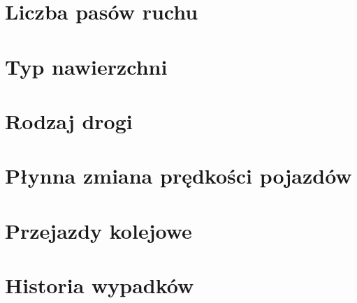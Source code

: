 \newpage
\section{Liczba pasów ruchu}
\label{sec:zakręty}

\newpage
\section{Typ nawierzchni}
\label{sec:zakręty}

\newpage
\section{Rodzaj drogi}
\label{sec:zakręty}

\newpage
\section{Płynna zmiana prędkości pojazdów}
\label{sec:zakręty}

\newpage
\section{Przejazdy kolejowe}
\label{sec:zakręty}

\newpage
\section{Historia wypadków}
\label{sec:zakręty}

